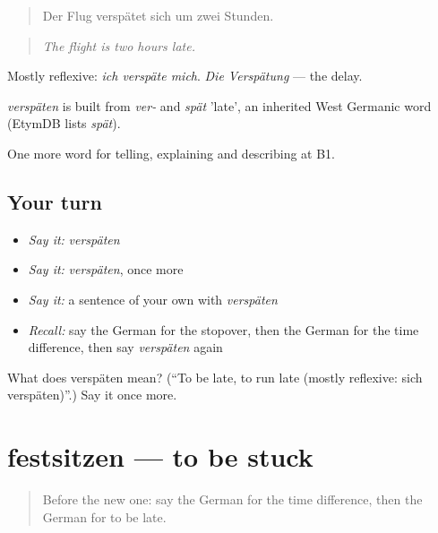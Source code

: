 \begin{quote}
Der Flug verspätet sich um zwei Stunden.
\end{quote}

\begin{quote}
\emph{The flight is two hours late.}
\end{quote}

Mostly reflexive: \emph{ich verspäte mich}. \emph{Die Verspätung} — the delay.

\begin{cousinweb}
\emph{verspäten} is built from \emph{ver-} and \emph{spät} 'late', an inherited West Germanic word (EtymDB lists \emph{spät}).
\end{cousinweb}

\begin{grammarlens}[title={What you've built}]
One more word for telling, explaining and describing at B1.
\end{grammarlens}

\subsection*{Your turn}
\begin{itemize}
\raggedright
  \item \emph{Say it:} \emph{verspäten}
  \item \emph{Say it:} \emph{verspäten}, once more
  \item \emph{Say it:} a sentence of your own with \emph{verspäten}
  \item \emph{Recall:} say the German for the stopover, then the German for the time difference, then say \emph{verspäten} again
\end{itemize}

\begin{tcolorbox}[breakable,colback=teal!4,colframe=teal!35!black,title={Before you move on}]
What does verspäten mean? (\textquotedblleft{}To be late, to run late (mostly reflexive: sich verspäten)\textquotedblright{}.) Say it once more.
\end{tcolorbox}
\section[festsitzen]{festsitzen — to be stuck}

\label{lesson:GE-C419-festsitzen}



\begin{quote}
Before the new one: say the German for the time difference, then the German for to be late.
\end{quote}

